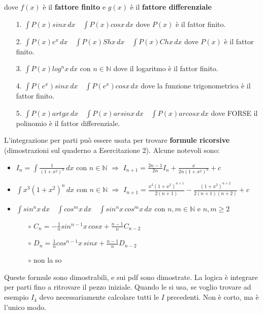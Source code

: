 \documentclass{article}
\theoremstyle{definition}
\theoremstyle{definition}
\theoremstyle{definition}
\theoremstyle{definition}
\theoremstyle{definition}
\theoremstyle{definition}
\begin{document}
dove $f(x)$ è il \textbf{fattore finito} e $g(x)$ è il \textbf{fattore differenziale}
\begin{itemize}
    \item [1.] $\displaystyle{\int P(x)sinx\,dx}\quad \displaystyle{\int P(x)cosx\,dx}$ dove $P(x)$ è il fattor finito.
    \item [2.] $\displaystyle{\int P(x)e^x\, dx} \quad \displaystyle{\int P(x)Shx\, dx} \quad \displaystyle{\int P(x)Chx\, dx}$ dove $P(x)$ è il fattor finito.
    \item [3.] $\displaystyle{\int P(x)log^nx\, dx}$ con $n\in\mathbb{N}$ dove il logaritmo è il fattor finito.
    \item [4.] $\displaystyle{\int P(e^x)sinx\,dx} \quad \displaystyle{\int P(e^x)cosx\,dx}$ dove la funzione trigonometrica è il fattor finito.
    \item [5.] $\displaystyle{\int P(x)artgx\, dx} \quad \displaystyle{\int P(x)arsinx\, dx} \quad \displaystyle{\int P(x)arcosx\, dx}$ dove FORSE il polinomio è il fattor differenziale.
\end{itemize}

L'integrazione per parti può essere usata per trovare \textbf{formule ricorsive} (dimostrazioni sul quaderno a Esercitazione 2). Alcune notevoli sono:
\begin{itemize}
    \item $\displaystyle{I_n=\int \frac{1}{(1+x^2)^n}\,dx}$ con $n\in\mathbb{N}$ $\Longrightarrow$ $\displaystyle{I_{n+1}= \frac{2n-1}{2n}I_n+\frac{x}{2n(1+x^2)^n}}+c$
    \item $\displaystyle{\int x^3 (1+x^2)^n\, dx}$ con $n\in\mathbb{N}$ $\Longrightarrow$ $\displaystyle{I_{n+1}=\frac{x^2(1+x^2)^{n+1}}{2(n+1)} - \frac{(1+x^2)^{n+2}}{2(n+1)(n+2)}}+c$
    \item $\displaystyle{\int sin^nx\,dx} \quad \displaystyle{\int cos^mx\,dx} \quad \displaystyle{\int sin^nx\,cos^mx\,dx}$ con $n,m\in\mathbb{N}$ e $n,m \geq 2$
    \begin{itemize}
        \item [$\circ$] $\displaystyle{C_n=-\frac{1}{n}sin^{n-1}x\,cosx+\frac{n-1}{n}C_{n-2}}$ 
        \item [$\circ$] $\displaystyle{D_n=\frac{1}{n}cos^{n-1}x\,sinx+\frac{n-1}{n}D_{n-2}}$
        \item [$\circ$] non la so
    \end{itemize}
\end{itemize}

Queste formule sono dimostrabili, e sui pdf sono dimostrate. La logica è integrare per parti fino a ritrovare il pezzo iniziale. Quando le si usa, se voglio trovare ad esempio $I_4$ devo necessariamente calcolare tutti le $I$ precedenti. Non è corto, ma è l'unico modo.
\end{document}
